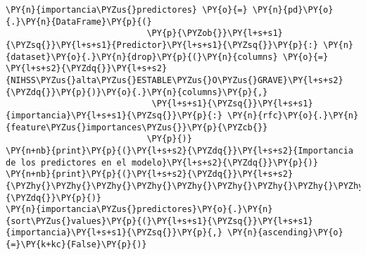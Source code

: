     \begin{tcolorbox}[breakable, size=fbox, boxrule=1pt, pad at break*=1mm,colback=cellbackground, colframe=cellborder]
\begin{Verbatim}[commandchars=\\\{\}]
\PY{n}{importancia\PYZus{}predictores} \PY{o}{=} \PY{n}{pd}\PY{o}{.}\PY{n}{DataFrame}\PY{p}{(}
                            \PY{p}{\PYZob{}}\PY{l+s+s1}{\PYZsq{}}\PY{l+s+s1}{Predictor}\PY{l+s+s1}{\PYZsq{}}\PY{p}{:} \PY{n}{dataset}\PY{o}{.}\PY{n}{drop}\PY{p}{(}\PY{n}{columns} \PY{o}{=} \PY{l+s+s2}{\PYZdq{}}\PY{l+s+s2}{NIHSS\PYZus{}alta\PYZus{}ESTABLE\PYZus{}O\PYZus{}GRAVE}\PY{l+s+s2}{\PYZdq{}}\PY{p}{)}\PY{o}{.}\PY{n}{columns}\PY{p}{,}
                             \PY{l+s+s1}{\PYZsq{}}\PY{l+s+s1}{importancia}\PY{l+s+s1}{\PYZsq{}}\PY{p}{:} \PY{n}{rfc}\PY{o}{.}\PY{n}{feature\PYZus{}importances\PYZus{}}\PY{p}{\PYZcb{}}
                            \PY{p}{)}
\PY{n+nb}{print}\PY{p}{(}\PY{l+s+s2}{\PYZdq{}}\PY{l+s+s2}{Importancia de los predictores en el modelo}\PY{l+s+s2}{\PYZdq{}}\PY{p}{)}
\PY{n+nb}{print}\PY{p}{(}\PY{l+s+s2}{\PYZdq{}}\PY{l+s+s2}{\PYZhy{}\PYZhy{}\PYZhy{}\PYZhy{}\PYZhy{}\PYZhy{}\PYZhy{}\PYZhy{}\PYZhy{}\PYZhy{}\PYZhy{}\PYZhy{}\PYZhy{}\PYZhy{}\PYZhy{}\PYZhy{}\PYZhy{}\PYZhy{}\PYZhy{}\PYZhy{}\PYZhy{}\PYZhy{}\PYZhy{}\PYZhy{}\PYZhy{}\PYZhy{}\PYZhy{}\PYZhy{}\PYZhy{}\PYZhy{}\PYZhy{}\PYZhy{}\PYZhy{}\PYZhy{}\PYZhy{}\PYZhy{}\PYZhy{}\PYZhy{}\PYZhy{}\PYZhy{}\PYZhy{}\PYZhy{}\PYZhy{}}\PY{l+s+s2}{\PYZdq{}}\PY{p}{)}
\PY{n}{importancia\PYZus{}predictores}\PY{o}{.}\PY{n}{sort\PYZus{}values}\PY{p}{(}\PY{l+s+s1}{\PYZsq{}}\PY{l+s+s1}{importancia}\PY{l+s+s1}{\PYZsq{}}\PY{p}{,} \PY{n}{ascending}\PY{o}{=}\PY{k+kc}{False}\PY{p}{)}
\end{Verbatim}
\end{tcolorbox}

